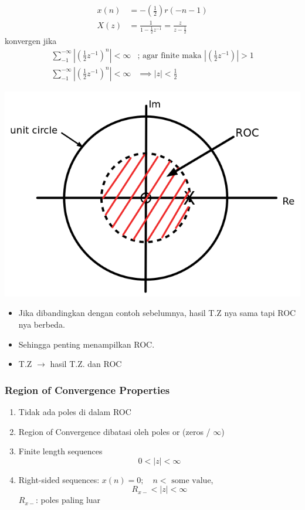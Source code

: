 \documentclass[pdflatex,compress,mathserif]{beamer}
\begin{document}
\begin{frame}
	\begin{align*}
		x(n) &= -\left(\frac{1}{2}\right)r(-n-1) \\
		X(z) &= \frac{1}{1-\frac{1}{2}z^{-1}} = \frac{z}{z - \frac{1}{2}}
	\end{align*}
	konvergen jika
	\begin{align*}
	\sum_{-1}^{-\infty} \left| \left(\frac{1}{2} z^{-1}\right)^n \right| < \infty &\text{;} \text{ agar finite maka }\left| \left(\frac{1}{2} z^{-1}\right) \right| > 1 \\
	\sum_{-1}^{-\infty} \left| \left(\frac{1}{2} z^{-1}\right)^n \right| < \infty&\implies |z| < \frac{1}{2}
	\end{align*}
\end{frame}

\begin{frame}
	\begin{center}
		\includegraphics[width=0.5\linewidth]{img/img02}
	\end{center}
	\begin{itemize}
		\item Jika dibandingkan dengan contoh sebelumnya, hasil T.Z nya sama tapi ROC nya berbeda.
		\item Sehingga penting menampilkan ROC.
		\item T.Z $\rightarrow$ hasil T.Z. dan ROC
	\end{itemize}
\end{frame}

\begin{frame}
	\frametitle{Region of Convergence Properties}
	\begin{enumerate}
		\item Tidak ada poles di dalam ROC
		\item Region of Convergence dibatasi oleh poles or (zeros / $\infty$)
		\item Finite length sequences \[ 0 < |z| < \infty\]
		\item Right-sided sequences: $ x(n) = 0; \quad n < \text{ some value} $, \[ R_{x-} < |z| < \infty \] $ R_{x-} $: poles paling luar
	\end{enumerate}
\end{frame}
\end{document}
